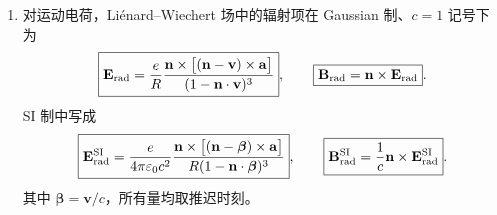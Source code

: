 \begin{question}
\begin{solution}
\begin{enumerate}
  \item 对运动电荷，Liénard--Wiechert 场中的辐射项在 Gaussian 制、$c=1$ 记号下为
  \[
    \boxed{\mathbf E_{\rm rad}
    =\frac{e}{R}\frac{\mathbf n\times\bigl[(\mathbf n-\mathbf v)\times\mathbf a\bigr]}{(1-\mathbf n\cdot\mathbf v)^3}},
    \qquad
    \boxed{\mathbf B_{\rm rad}=\mathbf n\times\mathbf E_{\rm rad}} .
  \]
  SI 制中写成
  \[
    \boxed{\mathbf E_{\rm rad}^{\rm SI}
    =\frac{e}{4\pi\varepsilon_0c^2}
    \frac{\mathbf n\times\bigl[(\mathbf n-\boldsymbol\beta)\times\mathbf a\bigr]}{R(1-\mathbf n\cdot\boldsymbol\beta)^3}},
    \qquad
    \boxed{\mathbf B_{\rm rad}^{\rm SI}=\frac1c\mathbf n\times\mathbf E_{\rm rad}^{\rm SI}} .
  \]
  其中 $\boldsymbol\beta=\mathbf v/c$，所有量均取推迟时刻。
\end{enumerate}
\end{solution}
\end{question}

